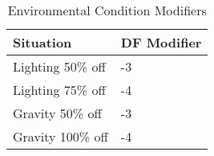 \begin{table}[h]
	\begin{tabular}{ll}

	Situation			& DF Modifier	\\
	\hline
	Lighting 50\% off	& -3			\\
	Lighting 75\% off	& -4			\\
	Gravity 50\% off	& -3			\\		   
	Gravity 100\% off	& -4			\\

    \end{tabular}
	\caption{Environmental Condition Modifiers}
\end{table}

